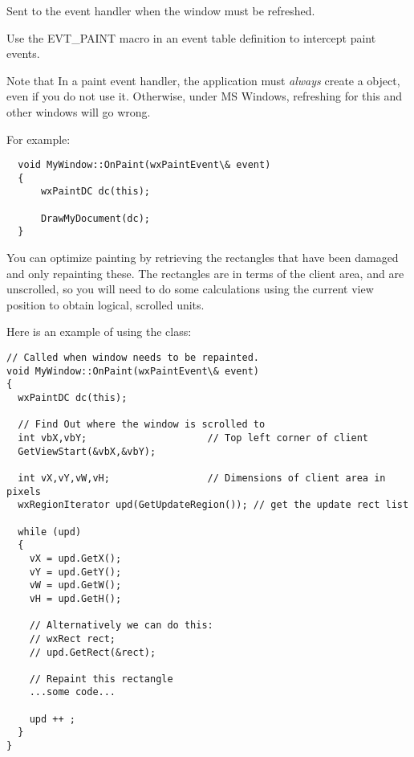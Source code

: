 \label{wxwindowonpaint}


Sent to the event handler when the window must be refreshed.




Use the EVT\_PAINT macro in an event table definition to intercept paint events.

Note that In a paint event handler, the application must {\it always} create a  object,
even if you do not use it. Otherwise, under MS Windows, refreshing for this and other windows will go wrong.

For example:

\small{%
\begin{verbatim}
  void MyWindow::OnPaint(wxPaintEvent\& event)
  {
      wxPaintDC dc(this);

      DrawMyDocument(dc);
  }
\end{verbatim}
}%

You can optimize painting by retrieving the rectangles
that have been damaged and only repainting these. The rectangles are in
terms of the client area, and are unscrolled, so you will need to do
some calculations using the current view position to obtain logical,
scrolled units.

Here is an example of using the  class:

{\small%
\begin{verbatim}
// Called when window needs to be repainted.
void MyWindow::OnPaint(wxPaintEvent\& event)
{
  wxPaintDC dc(this);

  // Find Out where the window is scrolled to
  int vbX,vbY;                     // Top left corner of client
  GetViewStart(&vbX,&vbY);

  int vX,vY,vW,vH;                 // Dimensions of client area in pixels
  wxRegionIterator upd(GetUpdateRegion()); // get the update rect list

  while (upd)
  {
    vX = upd.GetX();
    vY = upd.GetY();
    vW = upd.GetW();
    vH = upd.GetH();

    // Alternatively we can do this:
    // wxRect rect;
    // upd.GetRect(&rect);

    // Repaint this rectangle
    ...some code...

    upd ++ ;
  }
}
\end{verbatim}
}%

